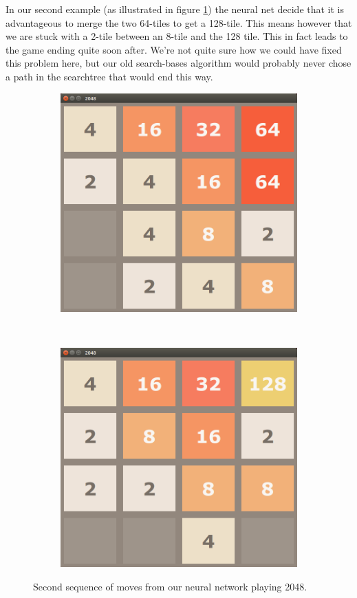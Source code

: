 \documentclass[11pt,a4paper]{article}
\begin{document}
In our second example (as illustrated in figure \ref{fig:second_seq}) the neural net decide that it is advantageous to merge the two 64-tiles to get a 128-tile. This means however that we are stuck with a 2-tile between an 8-tile and the 128 tile. This in fact leads to the game ending quite soon after. We're not quite sure how we could have fixed this problem here, but our old search-bases algorithm would probably never chose a path in the searchtree that would end this way.

\begin{figure}[h!]
    \centering
    \begin{subfigure}[b]{0.45\textwidth}
        \includegraphics[width=\textwidth]{figures/64}
    \end{subfigure}
    ~
    \begin{subfigure}[b]{0.45\textwidth}
        \includegraphics[width=\textwidth]{figures/128}
    \end{subfigure}
    \caption{Second sequence of moves from our neural network playing 2048.}
    \label{fig:second_seq}
\end{figure}
\end{document}
